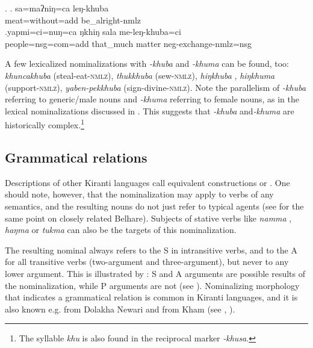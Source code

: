    \ex. \ag. sa=maʔniŋ=ca leŋ-khuba\\
		meat=without{\sc =add} be\_alright{\sc -nmlz}\\
	\bg.yapmi=ci=nuŋ=ca  ŋkhiŋ   sala   me-leŋ-khuba=ci\\
		people{\sc =nsg=com=add} that\_much matter {\sc neg}-exchange-{\sc nmlz=nsg}\\
	      

	
A few lexicalized nominalizations with \emph{-khuba} and \emph{-khuma} can be found, too: \emph{khuncakhuba}  (steal-eat-\textsc{nmlz}), \emph{thukkhuba}  (sew-\textsc{nmlz}), \emph{hiŋ\-khuba} , \emph{hiŋ\-khuma}  (support-\textsc{nmlz}), \emph{yaben-pekkhuba}  (sign-divine-\textsc{nmlz}). Note the parallelism of \emph{-khuba} referring to generic/male nouns and \emph{-khuma} referring to female nouns, as in the lexical nominalizations discussed in . This suggests that \emph{-khuba} and\emph{-khuma} are historically complex.\footnote{The syllable \emph{khu} is also found in the reciprocal marker \emph{-khusa}.}

\subsection{Grammatical relations}\label{khuba-gr}

Descriptions of other Kiranti languages call equivalent constructions  or  \citep{Tolsma1999A-grammar, Rutgers1998Yamphu, Ebert1997A-grammar, Ebert1999Nonfinite, Doornenbal2009A-grammar}. One should note, however, that the nominalization may apply to verbs of any semantics, and the resulting nouns do not just refer to typical agents (see \citet[180]{Bickel2004Hidden} for the same point on closely related Belhare). Subjects of stative verbs like \emph{namma} , \emph{haŋma}  or \emph{tukma}  can also be the targets of this nominalization. 
 
The resulting nominal always refers to the S in intransitive verbs, and to the A for all transitive verbs (two-argument and three-argument), but never to any lower argument. This is illustrated by \Next: S and A arguments are possible results of the nominalization, while P arguments are not (see \Next[c]). Nominalizing morphology that indicates a grammatical relation is common in Kiranti languages, and it is also known e.g. from  Dolakha Newari and from Kham (see \citet[409]{Genetti1992Semantic}, \citealt[376]{Ebert1999Nonfinite}). 
	

